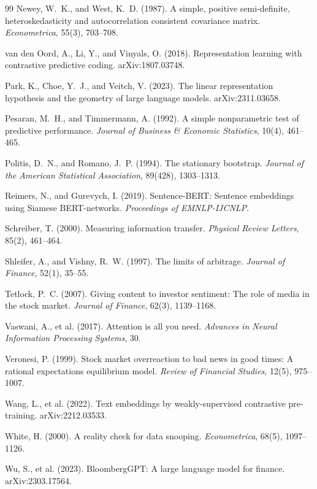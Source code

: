 \documentclass[11pt,a4paper]{article}
\theoremstyle{plain}
\theoremstyle{definition}
\theoremstyle{remark}
\begin{document}
\begin{thebibliography}{99}
Newey, W.~K., and West, K.~D. (1987). A simple, positive semi-definite, heteroskedasticity and autocorrelation consistent covariance matrix. \emph{Econometrica}, 55(3), 703--708.

van den Oord, A., Li, Y., and Vinyals, O. (2018). Representation learning with contrastive predictive coding. arXiv:1807.03748.

Park, K., Choe, Y.~J., and Veitch, V. (2023). The linear representation hypothesis and the geometry of large language models. arXiv:2311.03658.

Pesaran, M.~H., and Timmermann, A. (1992). A simple nonparametric test of predictive performance. \emph{Journal of Business \& Economic Statistics}, 10(4), 461--465.

Politis, D.~N., and Romano, J.~P. (1994). The stationary bootstrap. \emph{Journal of the American Statistical Association}, 89(428), 1303--1313.

Reimers, N., and Gurevych, I. (2019). Sentence-BERT: Sentence embeddings using Siamese BERT-networks. \emph{Proceedings of EMNLP-IJCNLP}.

Schreiber, T. (2000). Measuring information transfer. \emph{Physical Review Letters}, 85(2), 461--464.

Shleifer, A., and Vishny, R.~W. (1997). The limits of arbitrage. \emph{Journal of Finance}, 52(1), 35--55.

Tetlock, P.~C. (2007). Giving content to investor sentiment: The role of media in the stock market. \emph{Journal of Finance}, 62(3), 1139--1168.

Vaswani, A., et al. (2017). Attention is all you need. \emph{Advances in Neural Information Processing Systems}, 30.

Veronesi, P. (1999). Stock market overreaction to bad news in good times: A rational expectations equilibrium model. \emph{Review of Financial Studies}, 12(5), 975--1007.

Wang, L., et al. (2022). Text embeddings by weakly-supervised contrastive pre-training. arXiv:2212.03533.

White, H. (2000). A reality check for data snooping. \emph{Econometrica}, 68(5), 1097--1126.

Wu, S., et al. (2023). BloombergGPT: A large language model for finance. arXiv:2303.17564.

\end{thebibliography}
\end{document}

